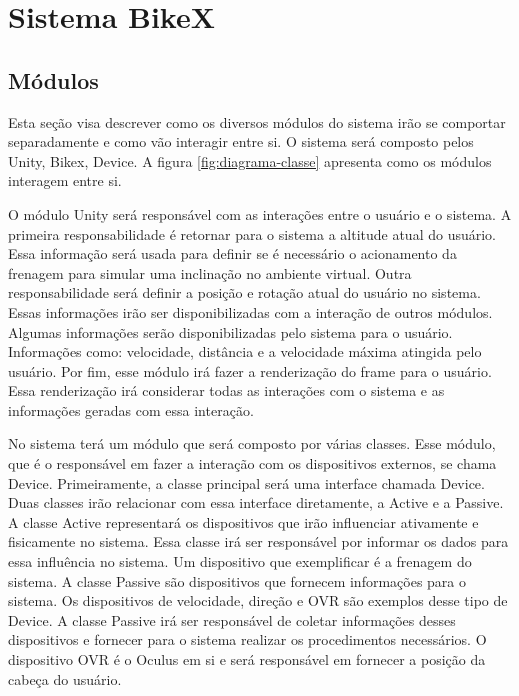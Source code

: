 \section{Sistema BikeX}
\label{sec:sistema_bikex}



\subsection{Módulos}
Esta seção visa descrever como os diversos módulos do sistema irão se comportar separadamente e como vão interagir entre si. O sistema será composto pelos Unity, Bikex, Device. A figura \ref{fig:diagrama-classe} apresenta como os módulos interagem entre si.

O módulo Unity será responsável com as interações entre o usuário e o sistema. A primeira responsabilidade é retornar para o sistema a altitude atual do usuário. Essa informação será usada para definir se é necessário o acionamento da frenagem para simular uma inclinação no ambiente virtual. Outra responsabilidade será definir a posição e rotação atual do usuário no sistema. Essas informações irão ser disponibilizadas com a interação de outros módulos. Algumas informações serão disponibilizadas pelo sistema para o usuário. Informações como: velocidade, distância e a velocidade máxima atingida pelo usuário. Por fim, esse módulo irá fazer a renderização do frame para o usuário. Essa renderização irá considerar todas as interações com o sistema e as informações geradas com essa interação.

No sistema terá um módulo que será composto por várias classes. Esse módulo, que é o responsável em fazer a interação com os dispositivos externos, se chama Device. Primeiramente, a classe principal será uma interface chamada Device. Duas classes irão relacionar com essa interface diretamente, a Active e a Passive. A classe Active representará os dispositivos que irão influenciar ativamente e fisicamente no sistema. Essa classe irá ser responsável por informar os dados para essa influência no sistema. Um dispositivo que exemplificar é a frenagem do sistema. A classe Passive são dispositivos que fornecem informações para o sistema. Os dispositivos de velocidade, direção e OVR são exemplos desse tipo de Device. A classe Passive irá ser responsável de coletar informações desses dispositivos e fornecer para o sistema realizar os procedimentos necessários. O dispositivo OVR é o Oculus em si e será responsável em fornecer a posição da cabeça do usuário.

